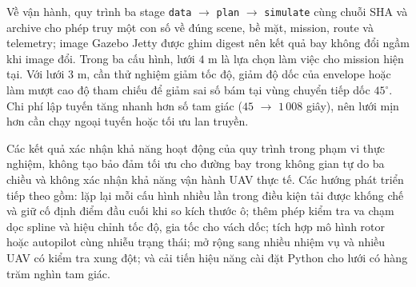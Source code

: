 Về vận hành, quy trình ba stage \texttt{data} $\to$ \texttt{plan} $\to$
\texttt{simulate} cùng chuỗi SHA và archive cho phép truy một con số về đúng scene,
bề mặt, mission, route và telemetry; image Gazebo Jetty được ghim digest nên kết
quả bay không đổi ngầm khi image đổi. Trong ba cấu hình, lưới $4$ m là lựa chọn làm việc cho
mission hiện tại. Với lưới $3$ m, cần thử nghiệm giảm tốc độ,
giảm độ dốc của envelope hoặc làm mượt cao độ tham chiếu
để giảm sai số bám tại vùng chuyển tiếp dốc $45^\circ$. Chi phí lập tuyến tăng nhanh hơn số tam giác ($45$ $\to$ $1\,008$
giây), nên lưới mịn hơn cần chạy ngoại tuyến hoặc tối ưu lan truyền.

Các kết quả xác nhận khả năng hoạt động của quy trình trong phạm vi thực nghiệm,
không tạo bảo đảm tối ưu cho đường bay trong không gian tự do ba chiều và không xác
nhận khả năng vận hành UAV thực tế. Các hướng phát triển tiếp theo gồm: lặp lại mỗi
cấu hình nhiều lần trong điều kiện tải được khống chế và giữ cố định điểm đầu cuối
khi so kích thước ô; thêm phép kiểm tra va chạm dọc spline và hiệu chỉnh tốc độ,
gia tốc cho vách dốc; tích hợp mô hình rotor hoặc autopilot cùng nhiễu trạng thái;
mở rộng sang nhiều nhiệm vụ và nhiều UAV có kiểm tra xung đột; và cải tiến hiệu
năng cài đặt Python cho lưới có hàng trăm nghìn tam giác.
